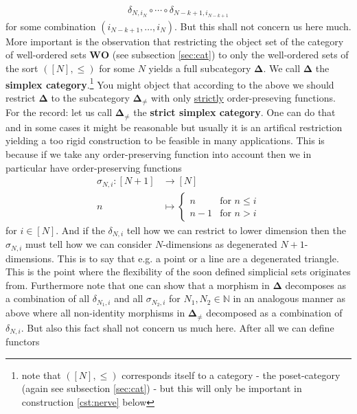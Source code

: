 \begin{align*}
  \delta_{N,i_{N}}
  \circ
  \cdots
  \circ
  \delta_{N-k+1,i_{N-k+1}}
\end{align*}
for some combination $(i_{N-k+1},\ldots,i_{N})$. But this shall not concern us here much. More important is the observation that restricting the object set of the category of well-ordered sets $\mathbf{WO}$ (see subsection \ref{sec:cat}) to only the well-ordered sets of the sort $([N],\leq)$ for some $N$ yields a full subcategory $\mathbf{\Delta}$. We call $\mathbf{\Delta}$ the \textbf{simplex category}.\footnote{note that $([N],\leq)$ corresponds itself to a category - the poset-category (again see subsection \ref{sec:cat}) - but this will only be important in construction \ref{cst:nerve} below} You might object that according to the above we should restrict $\mathbf{\Delta}$ to the subcategory $\mathbf{\Delta}_{\neq}$ with only \underline{strictly} order-preseving functions. For the record: let us call $\mathbf{\Delta}_{\neq}$ the \textbf{strict simplex category}. One can do that and in some cases it might be reasonable but usually it is an artifical restriction yielding a too rigid construction to be feasible in many applications. This is because if we take any order-preserving function into account then we in particular have order-preserving functions
\begin{align*}
  \sigma_{N,i}
  \colon
  [N + 1]
  &\rightarrow
  [N]
  \\
  n
  &\mapsto
  \begin{cases}
    n
    &
    \text{for }
    n
    \leq
    i
    \\
    n
    -
    1
    &
    \text{for }
    n
    >
    i
  \end{cases}
\end{align*}
for $i \in [N]$. And if the $\delta_{N,i}$ tell how we can restrict to lower dimension then the $\sigma_{N,i}$ must tell how we can consider $N$-dimensions as {\glqq}degenerated{\grqq} $N+1$-dimensions. This is to say that e.g. a point or a line are a degenerated triangle. This is the point where the flexibility of the soon defined simplicial sets originates from. Furthermore note that one can show that a morphism in $\mathbf{\Delta}$ decomposes as a combination of all $\delta_{N_{1},i}$ and all $\sigma_{N_{2},i}$ for $N_{1},N_{2} \in \mathbb{N}$ in an analogous manner as above where all non-identity morphisms in $\mathbf{\Delta}_{\neq}$ decomposed as a combination of $\delta_{N,i}$. But also this fact shall not concern us much here. After all we can define functors

